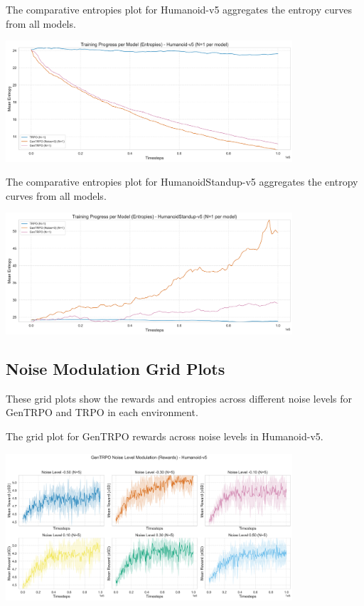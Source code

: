 \documentclass{svproc}
\begin{document}
The comparative entropies plot for Humanoid-v5 aggregates the entropy curves from all models.

\begin{center}
\includegraphics[width=0.8\textwidth]{graph_Humanoid-v5_models_entropies.png}
\end{center}

The comparative entropies plot for HumanoidStandup-v5 aggregates the entropy curves from all models.

\begin{center}
\includegraphics[width=0.8\textwidth]{graph_HumanoidStandup-v5_models_entropies.png}
\end{center}

\subsection{Noise Modulation Grid Plots}
These grid plots show the rewards and entropies across different noise levels for GenTRPO and TRPO in each environment.

The grid plot for GenTRPO rewards across noise levels in Humanoid-v5.

\begin{center}
\includegraphics[width=0.8\textwidth]{graph_Humanoid-v5_GenTRPO_noise_mod_rewards_grid.png}
\end{center}
\end{document}
